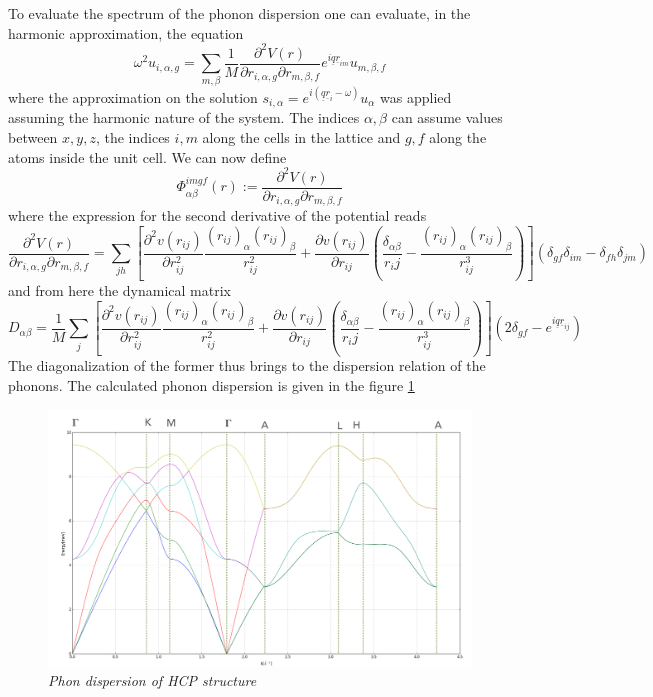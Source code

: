 \documentclass[a4paper]{article}
\begin{document}
    To evaluate the spectrum of the phonon dispersion one can evaluate, in the harmonic approximation, the equation 
    \begin{equation}
        \omega^2 u_{i,\alpha, g} = \sum_{m,\beta} \frac{1}{M}\frac{\partial^2 V(r)}{\partial r_{i,\alpha, g}\partial r_{m,\beta,f}}e^{i\underline{q}\underline{r}_{im}}u_{m,\beta, f}
    \end{equation}
    where the approximation on the solution $s_{i,\alpha}=e^{i(\underline{q}\underline{r}_i - \omega)}u_{\alpha}$ was applied assuming the harmonic nature of the system.
    The indices $\alpha,\beta$ can assume values between $x,y,z$, the indices $i,m$ along the cells in the lattice and $g,f$ along the atoms inside the unit cell.
    We can now define 
    \begin{equation}
        \Phi_{\alpha\beta}^{imgf}(r):=\frac{\partial^2 V(r)}{\partial r_{i,\alpha,g}\partial r_{m,\beta,f}}
    \end{equation}
    where the expression for the second derivative of the potential reads
    \begin{equation*}
        \frac{\partial^2 V(r)}{\partial r_{i,\alpha,g}\partial r_{m,\beta,f}} = \sum_{jh}\left[\frac{\partial^2 v(r_{ij})}{\partial r_{ij}^2}\frac{(r_{ij})_{\alpha}(r_{ij})_{\beta}}{r_{ij}^2} + \frac{\partial v(r_{ij})}{\partial r_{ij}}\left(\frac{\delta_{\alpha\beta}}{r_ij}-\frac{(r_{ij})_{\alpha}(r_{ij})_{\beta}}{r_{ij}^3}\right)\right](\delta_{gf}\delta_{im}-\delta_{fh}\delta_{jm})
    \end{equation*}
    and from here the dynamical matrix
    \begin{equation}
        D_{\alpha\beta} = \frac{1}{M}\sum_j\left[\frac{\partial^2 v(r_{ij})}{\partial r_{ij}^2}\frac{(r_{ij})_{\alpha}(r_{ij})_{\beta}}{r_{ij}^2} + \frac{\partial v(r_{ij})}{\partial r_{ij}}\left(\frac{\delta_{\alpha\beta}}{r_ij}-\frac{(r_{ij})_{\alpha}(r_{ij})_{\beta}}{r_{ij}^3}\right)\right]\left(2\delta_{gf}-e^{i\underline{q}\underline{r}_{ij}}\right)
    \end{equation}
    The diagonalization of the former thus brings to the dispersion relation of the phonons. The calculated phonon dispersion is given in the figure \ref{phonon-hcp}
    \begin{figure}[h]
        \centering
        \includegraphics[width=12cm]{phonon_hcp.png}
        \caption{\it \label{phonon-hcp}Phon dispersion of HCP structure}
    \end{figure}
\end{document}
